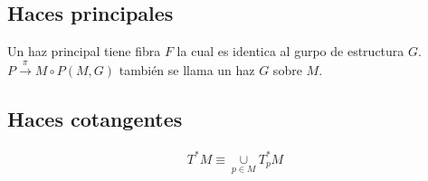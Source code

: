 \documentclass{article}
\begin{document}
\subsection{Haces principales }
Un haz principal tiene fibra $ F  $ la cual es identica al gurpo de estructura $ G  $. $ P \overset{\pi}{\rightarrow }M \circ P(M,G) $ también se llama un haz $ G  $ sobre $ M  $.

\subsection{Haces cotangentes }
\begin{gather*}
  T^* M \equiv \underset{p \in M }{\cup }T^*_p M 
\end{gather*}
\end{document}
